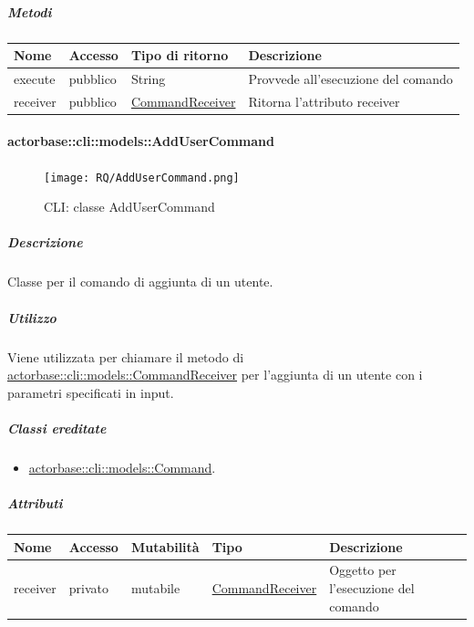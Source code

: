 \documentclass{scalatekids-article}
\begin{document}
\subparagraph{Metodi}

\begin{tabular}{| l | l | l | l |}
  \hline
  Nome & Accesso & Tipo di ritorno & Descrizione\\
  \hline
  execute & pubblico & String & Provvede all'esecuzione del comando\\
  \hline
  receiver & pubblico & \hyperref[sec:actorbase::cli::models::CommandReceiver]{CommandReceiver} & Ritorna l'attributo receiver\\
  \hline
\end{tabular}

\paragraph{actorbase::cli::models::AddUserCommand}
\label{sec:actorbase::cli::models::AddUserCommand}

\begin{figure}[H]
  \begin{center}
    \texttt{[image: RQ/AddUserCommand.png]}
    \caption{CLI: classe AddUserCommand}
  \end{center}
\end{figure}

\subparagraph{Descrizione}
Classe per il comando di aggiunta di un utente.

\subparagraph{Utilizzo}

Viene utilizzata per chiamare il metodo di
\hyperref[sec:actorbase::cli::models::CommandReceiver]{actorbase::cli::models::CommandReceiver} per l'aggiunta di un utente con i
parametri specificati in input.

\subparagraph{Classi ereditate}

\begin{itemize}
\item \hyperref[sec:actorbase::cli::models::Command]{actorbase::cli::models::Command}.
\end{itemize}

\subparagraph{Attributi}

\begin{tabular}{| p{1cm} | p{1.5cm} | p{2cm} | p{4cm} | p{8.5cm} |}
  \hline
  Nome & Accesso & Mutabilità & Tipo & Descrizione\\
  \hline
  receiver & privato & mutabile & \hyperref[sec:actorbase::cli::models::CommandReceiver]{CommandReceiver} & Oggetto per l'esecuzione del comando\\
  \hline
\end{tabular}
\end{document}
